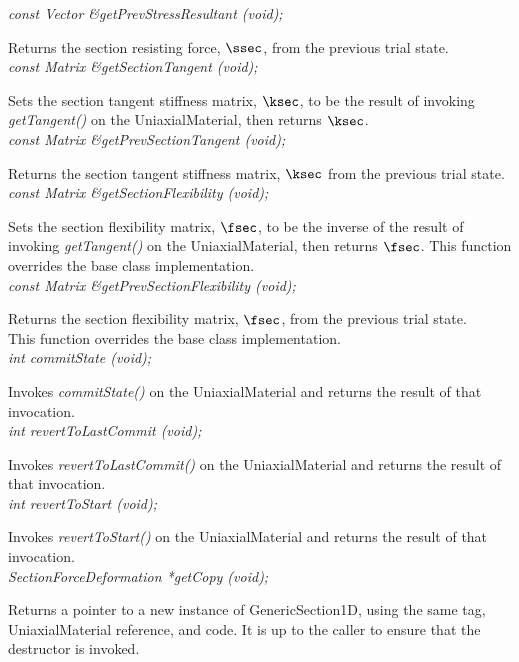 {\em const Vector \&getPrevStressResultant (void); } 

Returns the section resisting force, $\ssec$, from the previous trial state. \\

{\em const Matrix \&getSectionTangent (void); } 

Sets the section tangent stiffness matrix, $\ksec$, to be the result of
invoking {\em getTangent()} on the UniaxialMaterial, then returns $\ksec$. \\

{\em const Matrix \&getPrevSectionTangent (void); } 

Returns the section tangent stiffness matrix, $\ksec$ from the previous trial state. \\

{\em const Matrix \&getSectionFlexibility (void); } 

Sets the section flexibility matrix, $\fsec$, to be the inverse of the result
of invoking {\em getTangent()} on the UniaxialMaterial, then returns $\fsec$.
This function overrides the base class implementation. \\

{\em const Matrix \&getPrevSectionFlexibility (void); } 

Returns the section flexibility matrix, $\fsec$, from the previous trial state. \\
This function overrides the base class implementation. \\

{\em int commitState (void); } 

Invokes {\em commitState()} on the UniaxialMaterial and returns the
result of that invocation. \\

{\em int revertToLastCommit (void); } 

Invokes {\em revertToLastCommit()} on the UniaxialMaterial and returns the
result of that invocation. \\

{\em int revertToStart (void); } 

Invokes {\em revertToStart()} on the UniaxialMaterial and returns the
result of that invocation. \\

{\em SectionForceDeformation *getCopy (void); } 

Returns a pointer to a new instance of GenericSection1D, using the
same tag, UniaxialMaterial reference, and code. It is up to the caller to
ensure that the destructor is invoked. \\

